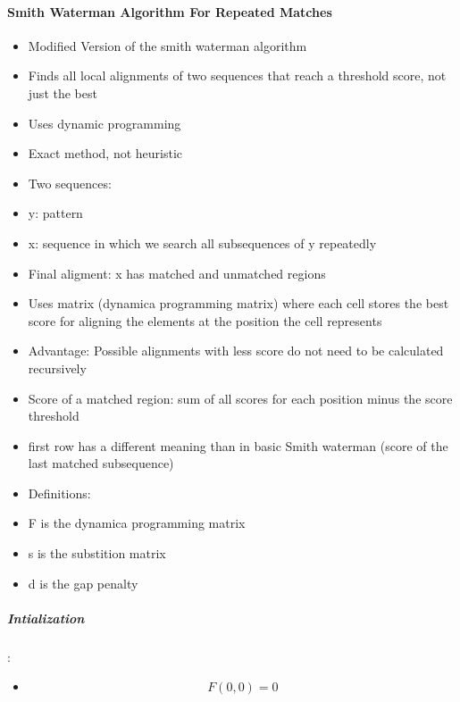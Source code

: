 \begin{itemize}
\paragraph{Smith Waterman Algorithm For Repeated Matches}
\begin{itemize}
	\item Modified Version of the smith waterman algorithm
	\item Finds all local alignments of two sequences that reach a threshold score, not just the best
	\item Uses dynamic programming
	\item Exact method, not heuristic
	\item Two sequences: 
	\item y: pattern
	\item x: sequence in which we search all subsequences of y repeatedly
	\item Final aligment: x has matched and unmatched regions
	\item Uses matrix (dynamica programming matrix) where each cell stores the best score for aligning the elements at the position the cell represents
	\item Advantage: Possible alignments with less score do not need to be calculated recursively
	\item Score of a matched region: sum of all scores for each position minus the score threshold 
	\item first row has a different meaning than in basic Smith waterman (score of the last matched subsequence)
	\item Definitions:
	\item F is the dynamica programming matrix
	\item s is the substition matrix
	\item d is the gap penalty
\end{itemize}

\subparagraph{Intialization}:
	\begin{itemize}
		\item \[F(0,0) = 0\]
	\end{itemize}


\end{itemize}
